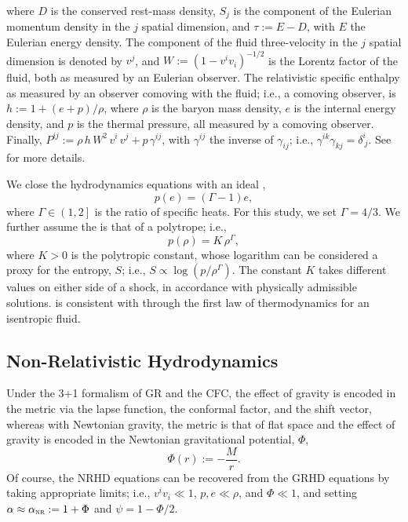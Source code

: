 where $D$ is the conserved rest-mass density,
$S_{j}$ is the component
of the Eulerian momentum density in the $j$\th{} spatial dimension,
and $\tau:=E-D$, with $E$ the Eulerian energy density.
The component of the fluid three-velocity in the $j$\th{} spatial dimension
is denoted by $v^{j}$, and
$W:=\left(1-v^{i}v_{i}\right)^{-1/2}$ is the Lorentz factor
of the fluid, both as measured by an Eulerian observer.
The relativistic specific enthalpy as measured by an observer
comoving with the fluid; i.e., a comoving observer, is
$h:=1+\left(e+p\right)/\rho$, where
$\rho$ is the baryon mass density, $e$ is the internal energy density,
and $p$ is the thermal pressure, all measured by a comoving observer.
Finally, $P^{ij}:=\rho\,h\,W^{2}\,v^{i}\,v^{j}+p\,\gamma^{ij}$,
with $\gamma^{ij}$ the inverse of $\gamma_{ij}$; i.e.,
$\gamma^{ik}\gamma_{kj}=\delta^{i}_{~j}$.
See \citet{rz2013} for more details.

We close the hydrodynamics equations
with an ideal \eos,
\begin{equation}
  p\left(e\right)=\left(\Gamma-1\right)e,
  \label{eq.idealEOS}
\end{equation}
where $\Gamma\in\left(1,2\right]$ is the ratio of specific heats.
For this study, we set $\Gamma=4/3$.
We further assume the \eos{} is that of a polytrope; i.e.,
\begin{equation}
  p\left(\rho\right)=K\,\rho^{\Gamma},
  \label{eq.polytrope}
\end{equation}
where $K>0$ is the polytropic constant,
whose logarithm can be considered a proxy for the entropy, $S$;
i.e., $S\propto\log\left(p/\rho^{\Gamma}\right)$.
The constant $K$ takes different values on either side of a
shock, in accordance with physically admissible solutions.
 is consistent with 
through the first law of thermodynamics for an isentropic fluid.

\subsection{Non-Relativistic Hydrodynamics}

Under the 3+1 formalism of GR and the CFC,
the effect of gravity is encoded in the metric via the lapse function,
the conformal factor, and the shift vector, whereas with
Newtonian gravity,
the metric is that of flat space and the effect of gravity
is encoded in the Newtonian gravitational potential, $\Phi$,
\begin{equation}
  \Phi\left(r\right):=-\frac{M}{r}.
\end{equation}
Of course, the NRHD equations can be recovered from the GRHD equations
by taking appropriate limits; i.e.,
$v^{i}v_{i}\ll1$, $p,e\ll\rho$,
and $\Phi\ll1$, and setting $\alpha\approx\alpha_{\textsc{nr}}:=1+\Phi$
and $\psi=1-\Phi/2$.

